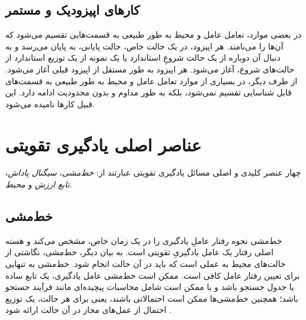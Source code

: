 

\subsection{کارهای اپیزودیک و مستمر}
در بعضی موارد، تعامل عامل و محیط به طور طبیعی به قسمت‌هایی تقسیم می‌شود که آن‌ها را 
\textit{}
می‌نامند. هر اپیزود، در یک حالت خاص، حالت پایانی، به پایان می‌رسد و به دنبال آن دوباره از یک حالت شروعِ استاندارد یا یک نمونه از یک توزیع استاندارد از حالت‌های شروع، آغاز می‌شود. هر اپیزود به طور مستقل از اپیزود قبلی آغاز می‌شود.
از طرف دیگر، در بسیاری از موارد تعامل عامل و محیط به طور طبیعی به قسمت‌های قابل شناسایی تقسیم نمی‌شود، بلکه به طور مداوم و بدون محدودیت ادامه دارد. این قبیل کارها 
\textit{
}
 نامیده می‌شود.
\section{عناصر اصلی یادگیری تقویتی}
چهار عنصر کلیدی و اصلی مسائل یادگیری تقویتی عبارتند از:
\textit{خط‌مشی}، 
\textit{سیگنال پاداش}،
\textit{تابع ارزش} 
و
\textit{محیط}.
\subsection{خط‌مشی}
خط‌مشی 
نحوه رفتار عاملِ یادگیری را در یک زمان خاص، مشخص می‌کند و هسته اصلی رفتار یک عامل یادگیریِ تقویتی است. به بیان دیگر، خط‌مشی، نگاشتی از حالت‌های محیط به عملی است که باید در آن حالت انجام شود. خط‌مشی به تنهایی برای تعیین رفتار عامل کافی است. ممکن است
خط‌مشی عامل یادگیری، یک تابع ساده یا جدول جستجو باشد و یا ممکن است شامل محاسبات پیچیده‌ای مانند فرآیند جستجو باشد؛ همچنین
خط‌مشی‌ها ممکن است احتمالاتی باشند، یعنی برای هر حالت، یک توزیع احتمال از عمل‌های مجاز در آن حالت ارائه شود
\cite{suttonbook}.
